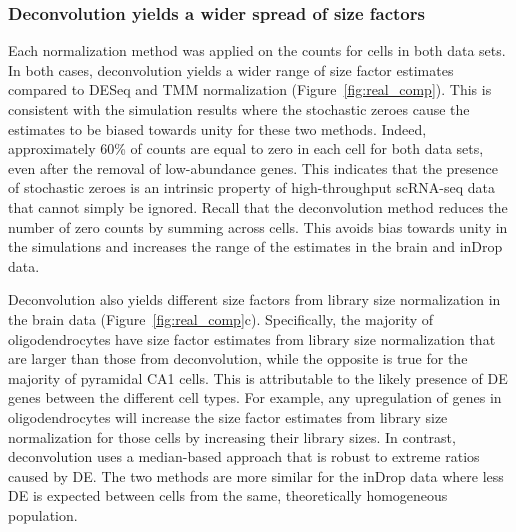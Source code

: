 \documentclass{bmcart}
\def\texttt{[image: ]}
\begin{document}
\subsubsection*{Deconvolution yields a wider spread of size factors}
Each normalization method was applied on the counts for cells in both data sets.
In both cases, deconvolution yields a wider range of size factor estimates compared to DESeq and TMM normalization (Figure~\ref{fig:real_comp}).
This is consistent with the simulation results where the stochastic zeroes cause the estimates to be biased towards unity for these two methods.
Indeed, approximately 60\% of counts are equal to zero in each cell for both data sets, even after the removal of low-abundance genes.
This indicates that the presence of stochastic zeroes is an intrinsic property of high-throughput scRNA-seq data that cannot simply be ignored.
Recall that the deconvolution method reduces the number of zero counts by summing across cells.
This avoids bias towards unity in the simulations and increases the range of the estimates in the brain and inDrop data.


Deconvolution also yields different size factors from library size normalization in the brain data (Figure~\ref{fig:real_comp}c).
Specifically, the majority of oligodendrocytes have size factor estimates from library size normalization that are larger than those from deconvolution,
    while the opposite is true for the majority of pyramidal CA1 cells.
This is attributable to the likely presence of DE genes between the different cell types.
For example, any upregulation of genes in oligodendrocytes will increase the size factor estimates from library size normalization for those cells by increasing their library sizes.
In contrast, deconvolution uses a median-based approach that is robust to extreme ratios caused by DE.
The two methods are more similar for the inDrop data where less DE is expected between cells from the same, theoretically homogeneous population.
\end{document}

